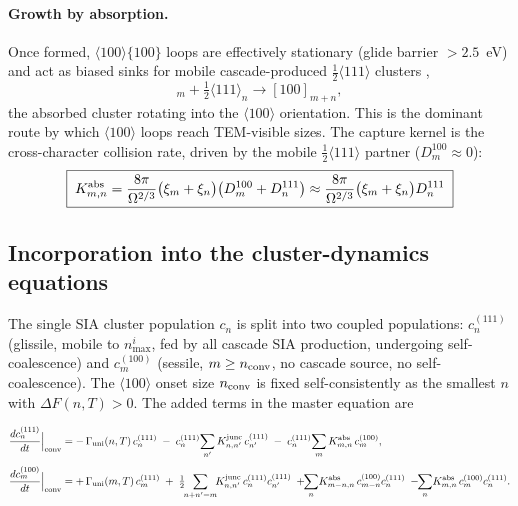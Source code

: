 \paragraph{Growth by absorption.}  Once formed, $\langle100\rangle\{100\}$ loops
are effectively stationary (glide barrier $>2.5$~eV) and act as biased sinks for
mobile cascade-produced $\tfrac12\langle111\rangle$ clusters \citep{Marian2002},
\begin{equation}
  [100]_m + \tfrac12\langle111\rangle_n \rightarrow [100]_{m+n},
  \label{eq:absorption}
\end{equation}
the absorbed cluster rotating into the $\langle100\rangle$ orientation.  This is
the dominant route by which $\langle100\rangle$ loops reach TEM-visible sizes.
The capture kernel is the cross-character collision rate, driven by the mobile
$\tfrac12\langle111\rangle$ partner ($D^{100}_m\approx0$):
\begin{equation}
  \boxed{\;K^{\rm abs}_{m,n} = \frac{8\pi}{\Omega^{2/3}}
  \big(\xi_m+\xi_n\big)\big(D^{100}_m+D^{111}_n\big)
  \approx \frac{8\pi}{\Omega^{2/3}}\big(\xi_m+\xi_n\big)D^{111}_n\;}
  \label{eq:Kabs}
\end{equation}

\subsection{Incorporation into the cluster-dynamics equations}
\label{sec:cd-incorporation}

The single SIA cluster population $c_n$ is split into two coupled populations:
$c_n^{(111)}$ (glissile, mobile to $n_{\max}^i$, fed by all cascade SIA
production, undergoing self-coalescence) and $c_m^{(100)}$ (sessile,
$m\ge n_{\rm conv}$, no cascade source, no self-coalescence).  The
$\langle100\rangle$ onset size $n_{\rm conv}$ is fixed self-consistently as the
smallest $n$ with $\Delta F(n,T)>0$.  The added terms in the master equation are

\begin{align}
  \frac{dc_n^{(111)}}{dt}\Big|_{\rm conv}
    &= -\,\Gamma_{\rm uni}(n,T)\,c_n^{(111)}
       \;-\; c_n^{(111)}\!\sum_{n'} K^{\rm junc}_{n,n'}\,c_{n'}^{(111)}
       \;-\; c_n^{(111)}\!\sum_{m} K^{\rm abs}_{m,n}\,c_m^{(100)},
       \label{eq:me-111}\\[4pt]
  \frac{dc_m^{(100)}}{dt}\Big|_{\rm conv}
    &= +\,\Gamma_{\rm uni}(m,T)\,c_m^{(111)}
       \;+\; \tfrac12\!\!\sum_{n+n'=m}\!\! K^{\rm junc}_{n,n'}\,c_n^{(111)}c_{n'}^{(111)}
       \;+\!\!\sum_{n}\! K^{\rm abs}_{m-n,n}\,c_{m-n}^{(100)}c_n^{(111)}
       \;-\!\!\sum_{n}\! K^{\rm abs}_{m,n}\,c_m^{(100)}c_n^{(111)}.
       \label{eq:me-100}
\end{align}

